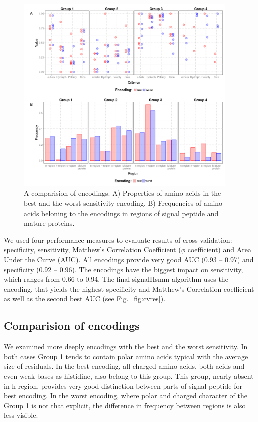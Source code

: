 \documentclass[fleqn,10pt,twoside]{gcb15submission}
\begin{document}
\begin{figure}[ht]\centering
\includegraphics[width=0.95\textwidth]{figures/enccomp.png}
\caption{A comparision of encodings. A) Properties of amino acids in the best and the worst sensitivity encoding. B) Frequencies of amino acids beloning to the encodings in regions of signal peptide and mature proteins.}
\label{fig:enccomp}
\end{figure}

We used four performance measures to evaluate results of cross-validation: specificity, sensitivity, Matthew's Correlation Coefficient ($\phi$ coefficient) and Area Under the Curve (AUC). All encodings provide very good AUC (0.93 -- 0.97) and specificity (0.92 -- 0.96). The encodings have the biggest impact on sensitivity, which ranges from 0.66 to 0.94. The final signalHsmm algorithm uses the encoding, that yields the highest specificity and Matthew's Correlation coefficient as well as the second best AUC (see Fig.~\ref{fig:cvres}).

\subsection*{Comparision of encodings}

We examined more deeply encodings with the best and the worst sensitivity. In both cases Group 1 tends to contain polar amino acids typical with the average size of residuals. In the best encoding, all charged amino acids, both acids and even weak bases as histidine, also belong to this group. This group, nearly absent in h-region, provides very good distinction between parts of signal peptide for best encoding. In the worst encoding, where polar and charged character of the Group 1 is not that explicit, the difference in frequency between regions is also less visible.
\end{document}
